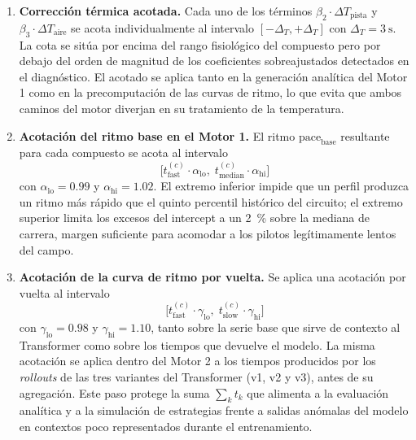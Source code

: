 \begin{enumerate}
    \item \textbf{Corrección térmica acotada.} Cada uno de los términos $\beta_2 \cdot \Delta T_{\text{pista}}$ y $\beta_3 \cdot \Delta T_{\text{aire}}$ se acota individualmente al intervalo $[-\Delta_T, +\Delta_T]$ con $\Delta_T = 3~\si{\second}$. La cota se sitúa por encima del rango fisiológico del compuesto pero por debajo del orden de magnitud de los coeficientes sobreajustados detectados en el diagnóstico. El acotado se aplica tanto en la generación analítica del Motor 1 como en la precomputación de las curvas de ritmo, lo que evita que ambos caminos del motor diverjan en su tratamiento de la temperatura.

    \item \textbf{Acotación del ritmo base en el Motor 1.} El ritmo $\text{pace}_{\text{base}}$ resultante para cada compuesto se acota al intervalo
    \begin{equation}
        \bigl[t^{(c)}_\text{fast} \cdot \alpha_\text{lo},\; t^{(c)}_\text{median} \cdot \alpha_\text{hi}\bigr]
        \label{eq:pace_base_clamp}
    \end{equation}
    con $\alpha_\text{lo} = 0.99$ y $\alpha_\text{hi} = 1.02$. El extremo inferior impide que un perfil produzca un ritmo más rápido que el quinto percentil histórico del circuito; el extremo superior limita los excesos del intercept a un 2~\% sobre la mediana de carrera, margen suficiente para acomodar a los pilotos legítimamente lentos del campo.

    \item \textbf{Acotación de la curva de ritmo por vuelta.} Se aplica una acotación por vuelta al intervalo
    \begin{equation}
        \bigl[t^{(c)}_\text{fast} \cdot \gamma_\text{lo},\; t^{(c)}_\text{slow} \cdot \gamma_\text{hi}\bigr]
        \label{eq:lap_clamp}
    \end{equation}
    con $\gamma_\text{lo} = 0.98$ y $\gamma_\text{hi} = 1.10$, tanto sobre la serie base que sirve de contexto al Transformer como sobre los tiempos que devuelve el modelo. La misma acotación se aplica dentro del Motor 2 a los tiempos producidos por los \textit{rollouts} de las tres variantes del Transformer (v1, v2 y v3), antes de su agregación. Este paso protege la suma $\sum_k t_k$ que alimenta a la evaluación analítica y a la simulación de estrategias frente a salidas anómalas del modelo en contextos poco representados durante el entrenamiento.


\end{enumerate}
